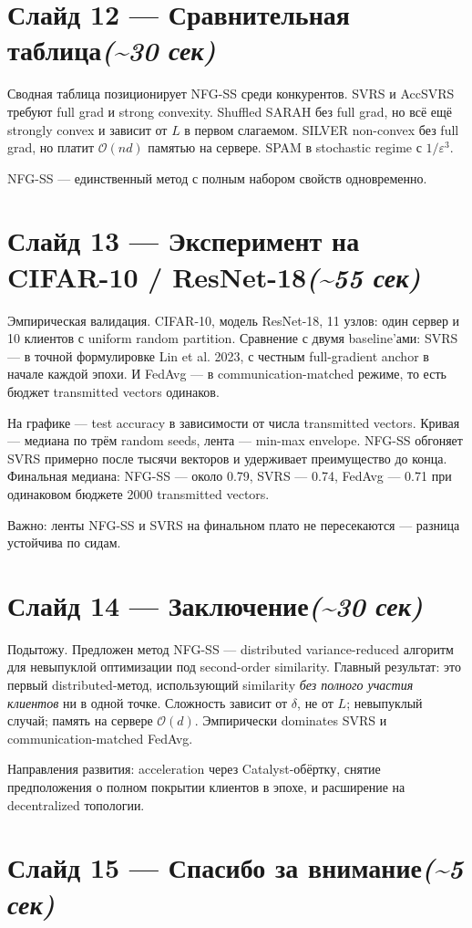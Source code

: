 \documentclass[11pt,a4paper]{article}
\newcommand{\slide}[3]{%
  \section*{Слайд #1 — #2\hfill\normalsize\color{lighttext}\textit{(\textasciitilde #3)}}%
}
\begin{document}
\slide{12}{Сравнительная таблица}{30 сек}

Сводная таблица позиционирует NFG-SS среди конкурентов. SVRS и AccSVRS требуют full grad и strong convexity. Shuffled SARAH без full grad, но всё ещё strongly convex и зависит от $L$ в первом слагаемом. SILVER non-convex без full grad, но платит $\mathcal{O}(nd)$ памятью на сервере. SPAM в stochastic regime с $1/\varepsilon^3$.

NFG-SS — единственный метод с полным набором свойств одновременно.

\slide{13}{Эксперимент на CIFAR-10 / ResNet-18}{55 сек}

Эмпирическая валидация. CIFAR-10, модель ResNet-18, 11 узлов: один сервер и 10 клиентов с uniform random partition. Сравнение с двумя baseline'ами: SVRS — в точной формулировке Lin et al. 2023, с честным full-gradient anchor в начале каждой эпохи. И FedAvg — в communication-matched режиме, то есть бюджет transmitted vectors одинаков.

На графике — test accuracy в зависимости от числа transmitted vectors. Кривая — медиана по трём random seeds, лента — min-max envelope. NFG-SS обгоняет SVRS примерно после тысячи векторов и удерживает преимущество до конца. Финальная медиана: NFG-SS — около 0.79, SVRS — 0.74, FedAvg — 0.71 при одинаковом бюджете 2000 transmitted vectors.

Важно: ленты NFG-SS и SVRS на финальном плато не пересекаются — разница устойчива по сидам.

\slide{14}{Заключение}{30 сек}

Подытожу. Предложен метод NFG-SS — distributed variance-reduced алгоритм для невыпуклой оптимизации под second-order similarity. Главный результат: это первый distributed-метод, использующий similarity \emph{без полного участия клиентов} ни в одной точке. Сложность зависит от $\delta$, не от $L$; невыпуклый случай; память на сервере $\mathcal{O}(d)$. Эмпирически dominates SVRS и communication-matched FedAvg.

Направления развития: acceleration через Catalyst-обёртку, снятие предположения о полном покрытии клиентов в эпохе, и расширение на decentralized топологии.

\slide{15}{Спасибо за внимание}{5 сек}
\end{document}
